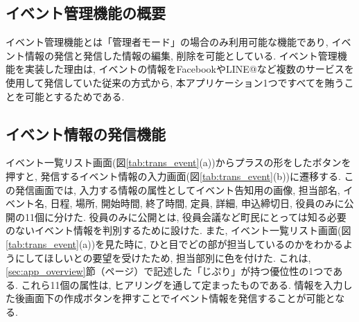 \subsection{イベント管理機能の概要}%
イベント管理機能とは「管理者モード」の場合のみ利用可能な機能であり, イベント情報の発信と発信した情報の編集, 削除を可能としている. イベント管理機能を実装した理由は, イベントの情報をFacebookやLINE@など複数のサービスを使用して発信していた従来の方式から, 本アプリケーション1つですべてを賄うことを可能とするためである.

\subsection{イベント情報の発信機能}%
\label{subsec:event_add}
イベント一覧リスト画面(図\ref{tab:trans_event}(a))からプラスの形をしたボタンを押すと, 発信するイベント情報の入力画面(図\ref{tab:trans_event}(b))に遷移する. この発信画面では, 入力する情報の属性としてイベント告知用の画像, 担当部名, イベント名, 日程, 場所, 開始時間, 終了時間, 定員, 詳細, 申込締切日, 役員のみに公開の11個に分けた. 役員のみに公開とは, 役員会議など町民にとっては知る必要のないイベント情報を判別するために設けた. また, イベント一覧リスト画面(図\ref{tab:trans_event}(a))を見た時に, ひと目でどの部が担当しているのかをわかるようにしてほしいとの要望を受けたため, 担当部別に色を付けた. これは, \ref{sec:app_overview}節（\pageref{sec:app_overview}ページ）で記述した「じぷり」が持つ優位性の1つである. これら11個の属性は, ヒアリングを通して定まったものである. 情報を入力した後画面下の作成ボタンを押すことでイベント情報を発信することが可能となる.

